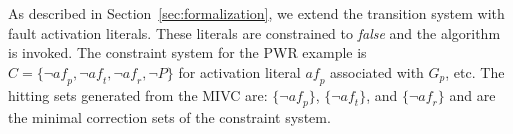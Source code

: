 As described in Section~\ref{sec:formalization}, we extend the transition system with fault activation literals. These literals are constrained to {\em false} and the \aivcalg algorithm is invoked. The constraint system for the PWR example is $C = \{\neg\mathit{af}_p, \neg\mathit{af}_t, \neg\mathit{af}_r, \neg P\}$ for activation literal $\mathit{af}_p$ associated with $G_p$, etc. The hitting sets generated from the MIVC are: $\{\neg\mathit{af}_p\}$, $\{\neg\mathit{af}_t\}$, and $\{\neg\mathit{af}_r\}$ and are the minimal correction sets of the constraint system. 




